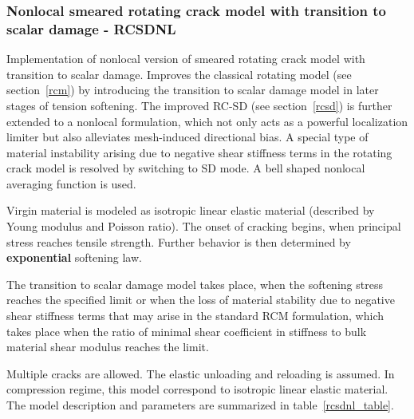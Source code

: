 \documentclass[a4paper]{article}
\begin{document}
\subsubsection{Nonlocal smeared rotating crack model with transition to scalar damage - RCSDNL}
\label{rcsdnl}
Implementation of nonlocal version of smeared rotating crack model with transition to
scalar damage.
Improves the classical rotating model (see
section~\ref{rcm}) by introducing the transition to scalar damage
model in  later stages of tension softening.
The improved RC-SD (see section~\ref{rcsd}) is further extended to a
nonlocal formulation, which not only acts as a powerful localization
limiter but also alleviates mesh-induced directional bias. A special
type of material instability arising due to negative shear stiffness
terms in the rotating crack model is resolved by switching to SD mode. A bell shaped nonlocal
averaging function is used.

Virgin material is modeled as isotropic linear elastic material
(described by Young modulus and Poisson
ratio). The onset of cracking begins, when principal stress reaches
tensile strength.
Further behavior is then determined by {\bf exponential} softening law.

The transition to scalar damage model
takes place, when the softening stress reaches the specified limit or
when the loss of material stability due to negative shear stiffness
terms that may arise in the standard RCM formulation, which takes
place when the ratio of minimal shear coefficient in stiffness to
bulk material shear modulus reaches the limit.

Multiple cracks are allowed.
The elastic unloading and reloading is assumed.
In compression regime, this model correspond to isotropic linear elastic material.
The model description and parameters are summarized
in table~\ref{rcsdnl_table}.
\end{document}
